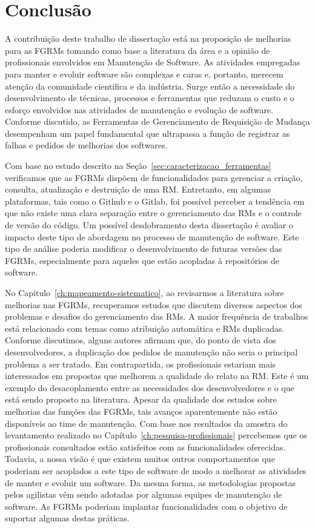 \chapter{Conclusão}
\label{ch:conclusao_trab_futuros}

A contribuição deste trabalho de dissertação está na proposição de melhorias
para as FGRMs tomando como base a literatura da área e a opinião de
profissionais envolvidos em Manutenção de Software. As atividades empregadas
para manter e evoluir software são complexas e caras e, portanto, merecem
atenção da comunidade científica e da indústria. Surge então a necessidade do
desenvolvimento de técnicas, processos e ferramentas que reduzam o custo e o
esforço envolvidos nas atividades de manutenção e evolução de software. Conforme
discutido, as Ferramentas de Gerenciamento de Requisição de Mudança desempenham
um papel fundamental que ultrapassa a função de registrar as falhas e pedidos de
melhorias dos softwares.

Com base no estudo descrito na Seção~\ref{sec:caracterizacao_ferramentas}
verificamos que as FGRMs dispõem de funcionalidades para gerenciar a criação,
consulta, atualização e destruição de uma RM\@. Entretanto, em algumas
plataformas, tais como o Github e o Gitlab, foi possível perceber a tendência em
que não existe uma clara separação entre o gerenciamento das RMs e o controle de
versão do código. Um possível desdobramento desta dissertação é avaliar o
impacto deste tipo de abordagem no processo de manutenção de software. Este tipo
de análise poderia modificar o desenvolvimento de futuras versões das FGRMs,
especialmente para aqueles que estão acopladas à repositórios de software.

No Capítulo~\ref{ch:mapeamento-sistematico}, ao revisarmos a literatura sobre
melhorias nas FGRMs, recuperamos estudos que discutem diversos aspectos dos
problemas e desafios do gerenciamento das RMs. A maior frequência de trabalhos
está relacionado com temas como atribuição automática e RMs duplicadas. Conforme
discutimos, alguns autores afirmam que, do ponto de vista dos desenvolvedores, a
duplicação dos pedidos de manutenção não seria o principal problema a ser
tratado. Em contrapartida, os profissionais estariam mais interessados em
propostas que melhorem a qualidade do relato na RM\@. Este é um exemplo do
desacoplamento entre as necessidades dos desenvolvedores e o que está sendo
proposto na literatura. Apesar da qualidade dos estudos sobre melhorias das
funções das FGRMs, tais avanços aparentemente não estão disponíveis ao time de
manutenção. Com base nos resultados da amostra do levantamento realizado no
Capítulo~\ref{ch:pesquisa-profissionais} percebemos que os profissionais
consultados estão satisfeitos com as funcionalidades oferecidas. Todavia, a
nossa visão é que existem muitos outros comportamentos que poderiam ser
acoplados a este tipo de software de modo a melhorar as atividades de manter e
evoluir um software. Da mesma forma, as metodologias propostas pelos agilistas
vêm sendo adotadas por algumas equipes de manutenção de software. As FGRMs
poderiam implantar funcionalidades com o objetivo de suportar algumas destas
práticas.

